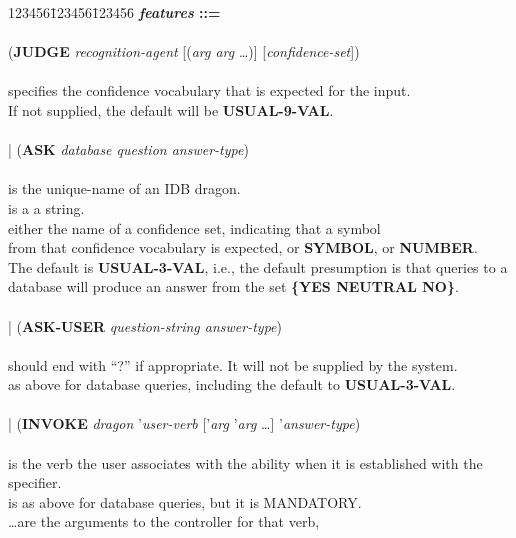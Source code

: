\begin{tabbing}
123456\=123456\=123456\= \kill
{\bf {\it features} ::= }\\
\\
\>({\bf JUDGE} {\it recognition-agent\/}
[({\it arg arg\/} \ldots)]  [{\it confidence-set\/}]) \\
\\
\> specifies the confidence vocabulary that is
expected for the input. \\
\>\>\>If not supplied, the default will be {\bf USUAL-9-VAL}. \\
\\
\>| ({\bf ASK} {\it database question answer-type\/}) \\
\\
\> is the unique-name of an IDB dragon. \\
\> is a a string. \\
\> either the name of a confidence set,
indicating that a symbol \\
\>\>\>from that confidence vocabulary is expected, or {\bf SYMBOL}, or {\bf NUMBER}.\\
\>\>\>The default is {\bf USUAL-3-VAL}, i.e., the default presumption
is that queries to a \\
\>\>\>database will produce an answer from the set {\bf \{YES NEUTRAL NO\}}. \\
\\
\>| ({\bf ASK-USER} {\it question-string answer-type\/}) \\
\\
\> should end with ``?'' if appropriate.  It will
not be supplied by the system. \\
\> as above for database queries, including the
default to {\bf USUAL-3-VAL}. \\
\\
\>| ({\bf INVOKE} {\it dragon} '{\it user-verb\/} 
['{\it arg} '{\it arg\/} \ldots] '{\it answer-type\/}) \\
\\
\> is the verb the user associates with the ability when
it is established with the\\
\>\> specifier. \\
\> is as above for database queries, but it is
MANDATORY.\\
\>\ldots are the arguments to the controller for that verb,

\end{tabbing}

